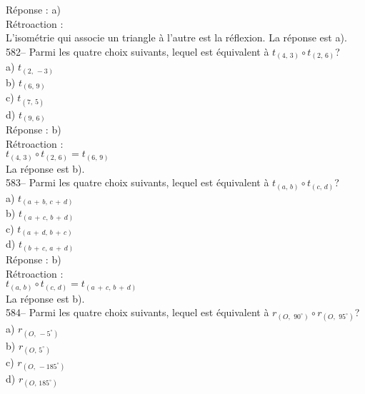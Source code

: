 ﻿\documentclass[letterpaper, 12pt]{article}
\begin{document}
R\'eponse : a) \\

R\'etroaction : \\
L'isom\'etrie qui associe un triangle \`a l'autre est la r\'eflexion.  La
r\'eponse est a).\\


582-- Parmi les quatre choix suivants, lequel est \'equivalent \`a
$t_{\left(4,\,3\right)} \circ t_{\left(2,\,6\right) }$?\\
a) $t_{\left(2,\,-3\right) }$\\
b) $t_{\left(6,\,9\right) }$\\
c) $t_{\left(7,\,5\right) }$\\
d) $t_{\left(9,\,6\right) }$\\

R\'eponse : b)\\

R\'etroaction : \\
$t_{\left(4,\,3\right)} \circ t_{\left(2,\,6\right) }= t_{\left(6,\,9\right)
}$\\
La r\'eponse est b).\\

583-- Parmi les quatre choix suivants, lequel est \'equivalent \`a
$t_{\left(a,\,b\right)} \circ t_{\left(c,\,d\right) }$?\\
a) $t_{\left(a\,+\,b,\,c\,+\,d\right) }$\\
b) $t_{\left(a\,+\,c,\,b\,+\,d\right) }$\\
c) $t_{\left(a\,+\,d,\,b\,+\,c\right) }$\\
d) $t_{\left(b\,+\,c,\,a\,+\,d\right) }$\\

R\'eponse : b)\\

R\'etroaction : \\
$t_{\left(a,\,b\right)} \circ t_{\left(c,\,d\right)
}=t_{\left(a\,+\,c,\,b\,+\,d\right) }$\\
La r\'eponse est b).\\

584-- Parmi les quatre choix suivants, lequel est \'equivalent \`a
$r_{\left( O,\,\,90^{\circ}\right)} \circ r_{\left( O,\,\,95^{\circ}\right)
}$?\\
a) $r_{\left(O,\,-5^{\circ}\right) }$\\
b) $r_{\left(O,\,5^{\circ}\right) }$\\
c) $r_{\left(O,\,-185^{\circ}\right) }$\\
d) $r_{\left(O,\,185^{\circ}\right) }$\\
\end{document}
